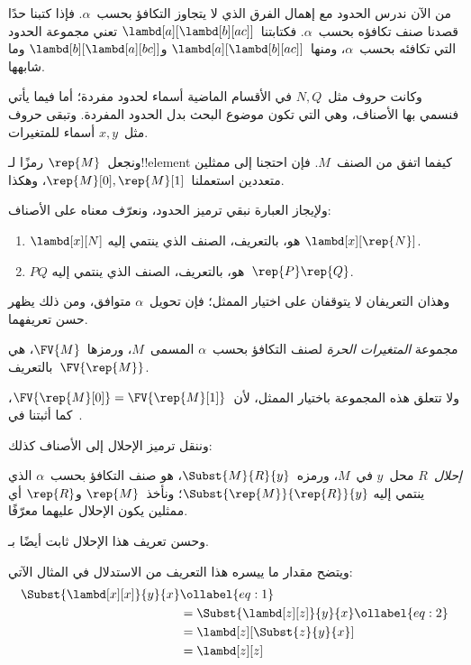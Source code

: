 \documentclass[../../../include/open-logic-section]{subfiles}
\begin{document}

من الآن ندرس الحدود مع إهمال الفرق الذي لا يتجاوز التكافؤ بحسب~$\alpha$.
فإذا كتبنا حدًا قصدنا صنف تكافؤه بحسب~$\alpha$.
فكتابتنا~$\lambd[a][\lambd[b][a c]]$ تعني مجموعة الحدود التي تكافئه بحسب~$\alpha$،
ومنها~$\lambd[a][\lambd[b][a c]]$ و$\lambd[b][\lambd[a][b c]]$ وما شابهها.

وكانت حروف مثل~$N, Q$ في الأقسام الماضية أسماء لحدود مفردة؛
أما فيما يأتي فنسمي بها الأصناف، وهي التي تكون موضوع البحث بدل الحدود المفردة.
وتبقى حروف مثل~$x, y$ أسماء للمتغيرات.

ونجعل~$\rep{M}$ رمزًا لـ!!{element} كيفما اتفق من الصنف~$M$.
فإن احتجنا إلى ممثلين متعددين استعملنا~$\rep{M}[0], \rep{M}[1]$، وهكذا.

ولإيجاز العبارة نبقي ترميز الحدود، ونعرّف معناه على الأصناف:
\begin{defn}
  \begin{enumerate}
  \item $\lambd[x][N]$ هو، بالتعريف، الصنف الذي ينتمي إليه
    $\lambd[x][\rep{N}]$.
  \item $PQ$ هو، بالتعريف، الصنف الذي ينتمي إليه~$\rep{P}\rep{Q}$.
  \end{enumerate}
\end{defn}

وهذان التعريفان لا يتوقفان على اختيار الممثل؛ فإن تحويل~$\alpha$ متوافق، ومن ذلك يظهر حسن تعريفهما.

\begin{defn} 
  مجموعة \emph{المتغيرات الحرة} لصنف التكافؤ بحسب~$\alpha$ المسمى~$M$،
  ورمزها~$\FV{M}$، هي بالتعريف~$\FV{\rep{M}}$.
\end{defn}

ولا تتعلق هذه المجموعة باختيار الممثل، لأن~$\FV{\rep{M}[0]} =
\FV{\rep{M}[1]}$، كما أثبتنا في~.

وننقل ترميز الإحلال إلى الأصناف كذلك:
\begin{defn} 
  \emph{إحلال}~$R$ محل~$y$ في~$M$، ورمزه~$\Subst{M}{R}{y}$،
  هو صنف التكافؤ بحسب~$\alpha$ الذي ينتمي إليه
  $\Subst{\rep{M}}{\rep{R}}{y}$؛ ونأخذ~$\rep{M}$ و$\rep{R}$ أي ممثلين يكون الإحلال عليهما معرّفًا.
\end{defn}

وحسن تعريف هذا الإحلال ثابت أيضًا بـ.

ويتضح مقدار ما ييسره هذا التعريف من الاستدلال في المثال الآتي:
\begin{align}
  \Subst{\lambd[x][x]}{y}{x} & \ollabel{eq:1}\\
  &= \Subst{\lambd[z][z]}{y}{x} \ollabel{eq:2}\\
  &= \lambd[z][\Subst{z}{y}{x}] \\
  &= \lambd[z][z]
\end{align}
\end{document}
